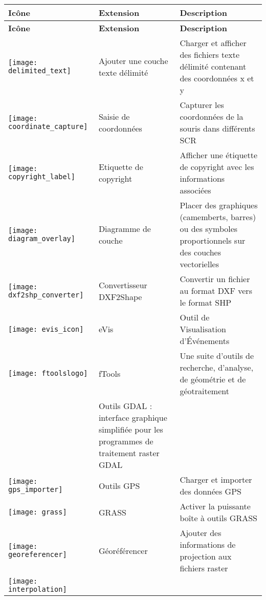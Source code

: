 {\setlength{\extrarowheight}{15pt}
\small
\begin{longtable}{|l|l|p{8cm}|}
\hline
 \textbf{Icône} & \textbf{Extension} & \textbf{Description}\\
\endfirsthead
\hline
\textbf{Icône} & \textbf{Extension} & \textbf{Description}\\
\endhead
\hline 
\texttt{[image: delimited\_text]}
 & Ajouter une couche texte délimité \index{extensions!texte delimite} & Charger et afficher des fichiers texte délimité contenant des coordonnées x et y\\
\hline
\texttt{[image: coordinate\_capture]}
 & Saisie de coordonnées \index{extensions!saisie de coordonnees} & Capturer les coordonnées de la souris dans différents SCR\\
\hline 
\texttt{[image: copyright\_label]}
 & Etiquette de copyright \index{extensions!copyright} & Afficher une étiquette de copyright avec les informations associées\\
\hline
\texttt{[image: diagram\_overlay]}
 & Diagramme de couche \index{plugins!diagram} & Placer des graphiques (camemberts, barres) ou des symboles proportionnels sur des couches vectorielles\\
\hline
\texttt{[image: dxf2shp\_converter]}
 & Convertisseur DXF2Shape \index{plugins!DXF2Shape} & Convertir un fichier au format DXF vers le format SHP\\
\hline
\texttt{[image: evis\_icon]}
 & eVis & Outil de Visualisation d'Événements\\
\hline
\texttt{[image: ftoolslogo]}
 & fTools \index{plugins!ftools} & Une suite d'outils de recherche, d'analyse, de géométrie et de géotraitement\\
\hline
 & Outils GDAL \index{plugins!gdaltools} : interface graphique simplifiée pour les programmes de traitement raster GDAL\\
\hline
\texttt{[image: gps\_importer]}
 & Outils GPS \index{plugins!gps} & Charger et importer des données GPS\\
\hline
\texttt{[image: grass]}
 & GRASS \index{plugin!grass toolbox} & Activer la puissante boîte à outils GRASS\\
\hline
\texttt{[image: georeferencer]}
 & Géoréférencer \index{plugin!georeferencer} & Ajouter des informations de projection aux fichiers raster\\
\hline
\texttt{[image: interpolation]}

\end{longtable}}
